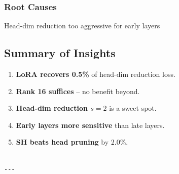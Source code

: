 \subsubsection{Root Causes}

Head-dim reduction too aggressive for early layers

\subsection{Summary of Insights}

\begin{enumerate}
\item \textbf{LoRA recovers 0.5\%} of head-dim reduction loss.
\item \textbf{Rank 16 suffices} -- no benefit beyond.
\item \textbf{Head-dim reduction $s=2$} is a sweet spot.
\item \textbf{Early layers more sensitive} than late layers.
\item \textbf{SH beats head pruning} by 2.0\%.
\end{enumerate}
\begin{lstlisting}

---
\end{lstlisting}